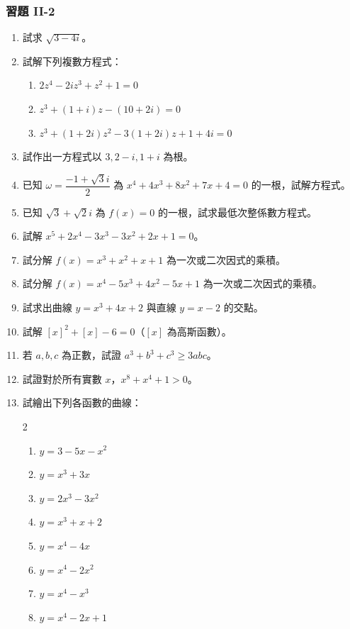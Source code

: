 \subsubsection*{習題 II-2}\label{sec:b6s-ex2-2}

\begin{enumerate}[label=\arabic*., leftmargin=2em]
  \item 試求 $\sqrt{3-4i}$。
  \item 試解下列複數方程式：
  \begin{enumerate}[label=(\roman*)]
    \item $2z^4 - 2iz^3 + z^2 + 1 = 0$
    \item $z^3 + (1+i)z - (10+2i) = 0$
    \item $z^3 + (1+2i)z^2 - 3(1+2i)z + 1 + 4i = 0$
  \end{enumerate}
  \item 試作出一方程式以 $3, 2-i, 1+i$ 為根。
  \item 已知 $\omega = \dfrac{-1+\sqrt{3}i}{2}$ 為 $x^4+4x^3+8x^2+7x+4=0$ 的一根，試解方程式。
  \item 已知 $\sqrt{3}+\sqrt{2}i$ 為 $f(x)=0$ 的一根，試求最低次整係數方程式。
  \item 試解 $x^5+2x^4-3x^3-3x^2+2x+1=0$。
  \item 試分解 $f(x)=x^3+x^2+x+1$ 為一次或二次因式的乘積。
  \item 試分解 $f(x)=x^4-5x^3+4x^2-5x+1$ 為一次或二次因式的乘積。
  \item 試求出曲線 $y=x^3+4x+2$ 與直線 $y=x-2$ 的交點。
  \item 試解 $[x]^2+[x]-6=0$（$[x]$ 為高斯函數）。
  \item 若 $a, b, c$ 為正數，試證 $a^3+b^3+c^3 \ge 3abc$。
  \item 試證對於所有實數 $x$，$x^8+x^4+1 > 0$。
  \item 試繪出下列各函數的曲線：
  \begin{multicols}{2}
  \begin{enumerate}[label=(\roman*)]
    \item $y = 3 - 5x - x^2$
    \item $y = x^3 + 3x$
    \item $y = 2x^3 - 3x^2$
    \item $y = x^3 + x + 2$
    \item $y = x^4 - 4x$
    \item $y = x^4 - 2x^2$
    \item $y = x^4 - x^3$
    \item $y = x^4 - 2x + 1$
  \end{enumerate}
  \end{multicols}
\end{enumerate}


